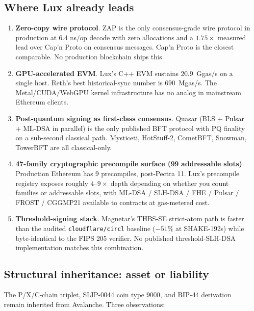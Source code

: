 \documentclass[11pt,a4paper]{article}
\begin{document}
\subsection{Where Lux already leads}

\begin{enumerate}[leftmargin=1.4em,topsep=0.2em,itemsep=0.1em]
  \item \textbf{Zero-copy wire protocol}. ZAP is the only consensus-grade
        wire protocol in production at 6.4 ns/op decode with zero
        allocations and a $1.75\times$ measured lead over Cap'n Proto on
        consensus messages. Cap'n Proto is the closest comparable. No
        production blockchain ships this.
  \item \textbf{GPU-accelerated EVM}. Lux's C++ EVM sustains
        $20.9$~Ggas/s on a single host. Reth's best historical-sync
        number is $690$~Mgas/s. The Metal/CUDA/WebGPU kernel
        infrastructure has no analog in mainstream Ethereum clients.
  \item \textbf{Post-quantum signing as first-class consensus}.
        Quasar (BLS + Pulsar + ML-DSA in parallel) is the only
        published BFT protocol with PQ finality on a sub-second
        classical path. Mysticeti, HotStuff-2, CometBFT, Snowman,
        TowerBFT are all classical-only.
  \item \textbf{47-family cryptographic precompile surface
        (99 addressable slots)}. Production Ethereum has 9 precompiles,
        post-Pectra 11. Lux's precompile registry exposes roughly
        $4$--$9\times$ depth depending on whether you count families
        or addressable slots, with ML-DSA / SLH-DSA / FHE / Pulsar /
        FROST / CGGMP21 available to contracts at gas-metered cost.
  \item \textbf{Threshold-signing stack}. Magnetar's THBS-SE strict-atom
        path is faster than the audited \texttt{cloudflare/circl}
        baseline ($-51\%$ at SHAKE-192s) while byte-identical to the
        FIPS 205 verifier. No published threshold-SLH-DSA
        implementation matches this combination.
\end{enumerate}

\subsection{Structural inheritance: asset or liability}

The P/X/C-chain triplet, SLIP-0044 coin type 9000, and BIP-44 derivation
remain inherited from Avalanche. Three observations:
\end{document}
